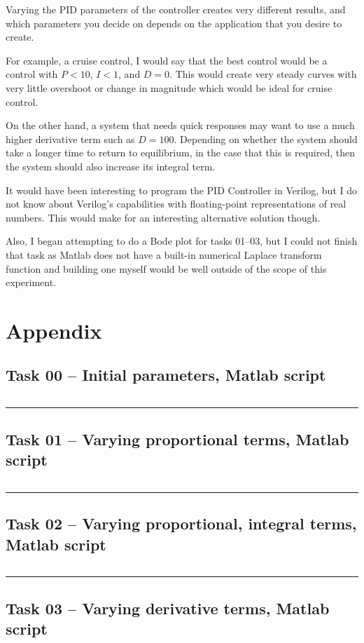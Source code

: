 \documentclass[12pt]{article}
\def\hr{{\par\noindent\rule{\textwidth}{0.4pt}}}
\begin{document}
Varying the PID parameters of the controller creates very different results, and which parameters you decide on depends on the application that you desire to create.

For example, a cruise control, I would say that the best control would be a control with $P < 10$, $I < 1$, and $D = 0$. This would create very steady curves with very little overshoot or change in magnitude which would be ideal for cruise control.

On the other hand, a system that needs quick responses may want to use a much higher derivative term such as $D=100$. Depending on whether the system should take a longer time to return to equilibrium, in the case that this is required, then the system should also increase its integral term.

It would have been interesting to program the PID Controller in Verilog,
but I do not know about Verilog's capabilities with floating-point representations of real numbers.
This would make for an interesting alternative solution though.

Also, I began attempting to do a Bode plot for tasks 01--03,
but I could not finish that task
as Matlab does not have a built-in numerical Laplace transform function
and building one myself would be well outside of the scope of this experiment.

\newpage
\printbibliography

\newpage
\appendix
\section{Appendix}\label{app}

\subsection{Task 00 -- Initial parameters, Matlab script}\label{sap:initial params}
\inputminted{matlab}{src/lab09_task00_initial_dc_motor_motor_params.m}

\hr{}

\subsection{Task 01 -- Varying proportional terms, Matlab script}\label{sap:vary p}
\inputminted{matlab}{src/lab09_task01_vary_p.m}

\hr{}

\subsection{Task 02 -- Varying proportional, integral terms, Matlab script}\label{sap:vary pi}
\inputminted{matlab}{src/lab09_task02_vary_i.m}

\hr{}

\subsection{Task 03 -- Varying derivative terms, Matlab script}\label{sap:vary d}
\inputminted{matlab}{src/lab09_task03_vary_d.m}
\end{document}
